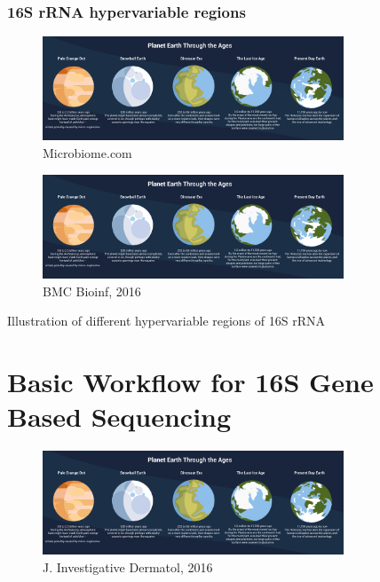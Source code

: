 \documentclass[
]{book}
\begin{document}
\hypertarget{s-rrna-hypervariable-regions}{%
\subsubsection{16S rRNA hypervariable regions}\label{s-rrna-hypervariable-regions}}

\begin{figure}
\centering
\includegraphics[width=0.8\textwidth,height=\textheight]{./Figures/Planets.png}
\caption{Microbiome.com}
\end{figure}

\begin{figure}
\centering
\includegraphics[width=0.8\textwidth,height=\textheight]{./Figures/Planets.png}
\caption{BMC Bioinf, 2016}
\end{figure}

Illustration of different hypervariable regions of 16S rRNA

\hypertarget{basic-workflow-for-16s-gene-based-sequencing}{%
\section{Basic Workflow for 16S Gene Based Sequencing}\label{basic-workflow-for-16s-gene-based-sequencing}}

\begin{figure}
\centering
\includegraphics[width=0.8\textwidth,height=\textheight]{./Figures/Planets.png}
\caption{J. Investigative Dermatol, 2016}
\end{figure}
\end{document}
